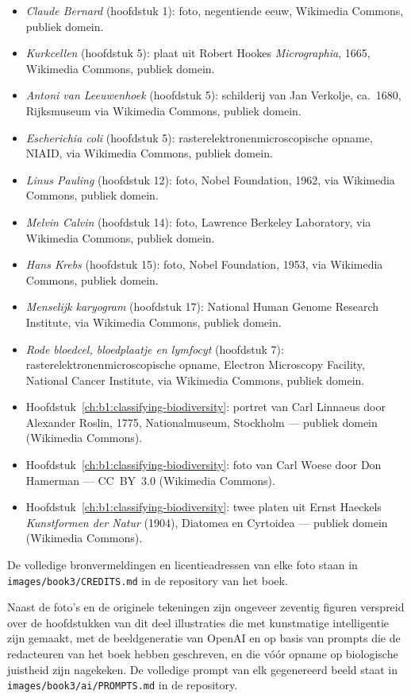 \begin{itemize}
  \item \emph{Claude Bernard} (hoofdstuk 1): foto, negentiende eeuw,
        Wikimedia Commons, publiek domein.
  \item \emph{Kurkcellen} (hoofdstuk 5): plaat uit Robert Hookes
        \emph{Micrographia}, 1665, Wikimedia Commons, publiek domein.
  \item \emph{Antoni van Leeuwenhoek} (hoofdstuk 5): schilderij van
        Jan Verkolje, ca.~1680, Rijksmuseum via Wikimedia Commons,
        publiek domein.
  \item \emph{Escherichia coli} (hoofdstuk 5): rasterelektronen\-microscopische
        opname, NIAID, via Wikimedia Commons, publiek domein.
  \item \emph{Linus Pauling} (hoofdstuk 12): foto, Nobel Foundation,
        1962, via Wikimedia Commons, publiek domein.
  \item \emph{Melvin Calvin} (hoofdstuk 14): foto, Lawrence Berkeley
        Laboratory, via Wikimedia Commons, publiek domein.
  \item \emph{Hans Krebs} (hoofdstuk 15): foto, Nobel Foundation,
        1953, via Wikimedia Commons, publiek domein.
  \item \emph{Menselijk karyogram} (hoofdstuk 17): National Human
        Genome Research Institute, via Wikimedia Commons, publiek
        domein.
  \item \emph{Rode bloedcel, bloedplaatje en lymfocyt} (hoofdstuk 7):
        rasterelektronen\-microscopische opname, Electron Microscopy
        Facility, National Cancer Institute, via Wikimedia Commons,
        publiek domein.
  \item Hoofdstuk~\ref{ch:b1:classifying-biodiversity}: portret van Carl Linnaeus door Alexander Roslin, 1775, Nationalmuseum, Stockholm --- publiek domein (Wikimedia Commons).
  \item Hoofdstuk~\ref{ch:b1:classifying-biodiversity}: foto van Carl Woese door Don Hamerman --- CC~BY~3.0 (Wikimedia Commons).
  \item Hoofdstuk~\ref{ch:b1:classifying-biodiversity}: twee platen uit Ernst Haeckels \emph{Kunstformen der Natur} (1904), Diatomea en Cyrtoidea --- publiek domein (Wikimedia Commons).
\end{itemize}

De volledige bronvermeldingen en licentieadressen van elke foto staan
in \texttt{images/\allowbreak book3/\allowbreak CREDITS.md} in de repository van het boek.

\bigskip
Naast de foto's en de originele tekeningen zijn ongeveer zeventig
figuren verspreid over de hoofdstukken van dit deel illustraties die
met kunstmatige intelligentie zijn gemaakt, met de beeldgeneratie van
OpenAI en op basis van prompts die de redacteuren van het boek hebben
geschreven, en die vóór opname op biologische juistheid zijn
nagekeken. De volledige prompt van elk gegenereerd beeld staat in
\texttt{images/\allowbreak book3/\allowbreak ai/\allowbreak PROMPTS.md} in de repository.
\par\endgroup
\clearpage
